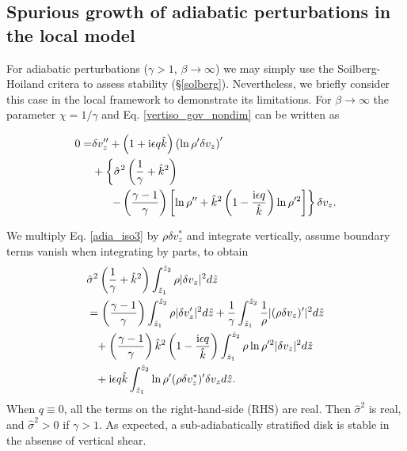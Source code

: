 \subsection{Spurious growth of adiabatic perturbations in the local
  model}\label{analytic_adia} 
For adiabatic perturbations ($\gamma>1$, $\beta\to\infty$) we may
simply use the Soilberg-Hoiland critera to assess stability
(\S\ref{solberg}). Nevertheless, we briefly consider this case in the
local framework to demonstrate its limitations. For $\beta\to\infty$
the parameter $\chi = 1/\gamma$ and Eq. \ref{vertiso_gov_nondim} can
be written as   

\begin{align}
  0 =& \delta v_z^{\prime\prime} + \left(1 + \mathrm{i} \epsilon q
    \hat{k}\right)\left(\ln\rho^{\prime}\delta v_z\right)^\prime\notag\\
  &+\left\{\hat{\sigma}^2\left(\frac{1}{\gamma}+\hat{k}^2\right)\right.\notag\\
  &\phantom{0=}\left.-\left(\frac{\gamma-1}{\gamma}\right)\left[\ln\rho^{\prime\prime}+\hat{k}^2\left(1-\frac{\mathrm{i}\epsilon  
          q}{\hat{k}}\right)\ln\rho^{\prime 2}\right]\right\}\delta v_z.\label{adia_iso3}
\end{align}

We multiply Eq. \ref{adia_iso3} by $\rho\delta v_z^*$ and
integrate vertically, assume boundary terms vanish when integrating by
parts, to obtain
\begin{align}
  &\hat{\sigma}^2\left(\frac{1}{\gamma} +
    \hat{k}^2\right)\int_{\hat{z}_1}^{\hat{z}_2}\rho|\delta
  v_z|^2 d\hat{z} \notag\\
  &=  \left(\frac{\gamma-1}{\gamma}\right)
  \int_{\hat{z}_1}^{\hat{z}_2}\rho|\delta v_z^\prime|^2 d\hat{z}
  +\frac{1}{\gamma}\int_{\hat{z}_1}^{\hat{z}_2}\frac{1}{\rho}|(\rho\delta
  v_z)^\prime|^2 d\hat{z}\notag\\
  &\phantom{=} +
  \left(\frac{\gamma-1}{\gamma}\right)\hat{k}^2\left(1-\frac{\mathrm{i}\epsilon
      q}{\hat{k}}\right) \int_{\hat{z}_1}^{\hat{z}_2}\rho\ln\rho^{\prime
    2}|\delta v_z|^2 d\hat{z}\notag\\
  &\phantom{=} + \mathrm{i}\epsilon q \hat{k}
  \int_{\hat{z}_1}^{\hat{z}_2}\ln\rho^\prime(\rho\delta v_z^*)^\prime
  \delta v_z d\hat{z}.\label{adia_integral}
\end{align}
When $q\equiv0$, all the terms on the right-hand-side (RHS) are real. Then
$\hat{\sigma}^2$ is real, and  $\hat{\sigma}^2>0$ if $\gamma>1$. As
expected, a sub-adiabatically stratified disk is stable in the absense
of vertical shear. 

